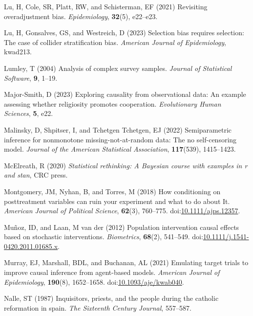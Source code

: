 \documentclass[
  singlecolumn]{article}
\newlength{\cslhangindent}
\newenvironment{CSLReferences}[2] %
 {\begin{list}{}{%
  \setlength{\itemindent}{0pt}
  \setlength{\leftmargin}{0pt}
  \setlength{\parsep}{0pt}
  \ifodd #1
   \setlength{\leftmargin}{\cslhangindent}
   \setlength{\itemindent}{-1\cslhangindent}
  \fi
  \setlength{\itemsep}{#2\baselineskip}}}
 {\end{list}}
\begin{document}
\begin{CSLReferences}{1}{0}
Lu, H, Cole, SR, Platt, RW, and Schisterman, EF (2021) Revisiting
overadjustment bias. \emph{Epidemiology}, \textbf{32}(5), e22--e23.

Lu, H, Gonsalves, GS, and Westreich, D (2023) Selection bias requires
selection: The case of collider stratification bias. \emph{American
Journal of Epidemiology}, kwad213.

Lumley, T (2004) Analysis of complex survey samples. \emph{Journal of
Statistical Software}, \textbf{9}, 1--19.

Major-Smith, D (2023) Exploring causality from observational data: An
example assessing whether religiosity promotes cooperation.
\emph{Evolutionary Human Sciences}, \textbf{5}, e22.

Malinsky, D, Shpitser, I, and Tchetgen Tchetgen, EJ (2022)
Semiparametric inference for nonmonotone missing-not-at-random data: The
no self-censoring model. \emph{Journal of the American Statistical
Association}, \textbf{117}(539), 1415--1423.

McElreath, R (2020) \emph{Statistical rethinking: A {B}ayesian course
with examples in r and stan}, CRC press.

Montgomery, JM, Nyhan, B, and Torres, M (2018) How conditioning on
posttreatment variables can ruin your experiment and what to do about
It. \emph{American Journal of Political Science}, \textbf{62}(3),
760--775.
doi:\href{https://doi.org/10.1111/ajps.12357}{10.1111/ajps.12357}.

Muñoz, ID, and Laan, M van der (2012) Population intervention causal
effects based on stochastic interventions. \emph{Biometrics},
\textbf{68}(2), 541--549.
doi:\href{https://doi.org/10.1111/j.1541-0420.2011.01685.x}{10.1111/j.1541-0420.2011.01685.x}.

Murray, EJ, Marshall, BDL, and Buchanan, AL (2021) Emulating target
trials to improve causal inference from agent-based models.
\emph{American Journal of Epidemiology}, \textbf{190}(8), 1652--1658.
doi:\href{https://doi.org/10.1093/aje/kwab040}{10.1093/aje/kwab040}.

Nalle, ST (1987) Inquisitors, priests, and the people during the
catholic reformation in spain. \emph{The Sixteenth Century Journal},
557--587.


\end{CSLReferences}
\end{document}
